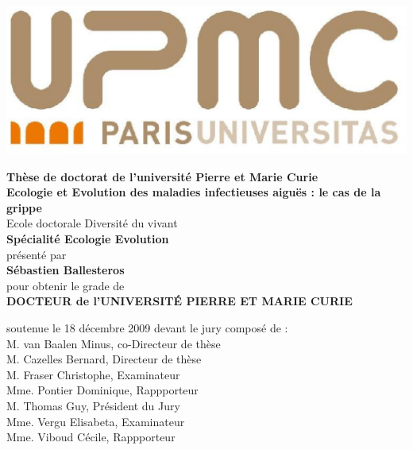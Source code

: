 \begin{titlepage}
\thispagestyle{empty}
\noindent

\includegraphics[width=0.2\linewidth]{upmc.eps}

\begin{center}
\begin{minipage}{\plarg}
\centering
{\large\bfseries Thèse de doctorat de l'université Pierre et Marie Curie}\\ \vspace{0.4cm}
{\huge\bfseries Ecologie et Evolution des maladies infectieuses aiguës : le cas
  de la grippe }\\ \vspace{0.4cm}
Ecole doctorale Diversité du vivant\\ \vspace{1mm}
{\large\bfseries Spécialité Ecologie Evolution}\\ \vspace{0.4cm}
présenté par \\ \vspace{1mm}
{\large\bfseries Sébastien Ballesteros }\\ \vspace{0.4cm}
pour obtenir le grade de \\ \vspace{1mm}
{\large\bfseries DOCTEUR de l’UNIVERSITÉ PIERRE ET MARIE CURIE}\\ \vspace{0.4cm}
\end{minipage}
\end{center}

\noindent
soutenue le 18 décembre 2009 devant le jury composé de : \vspace{5mm}\\
M. van Baalen Minus, co-Directeur de thèse\\
M. Cazelles Bernard, Directeur de thèse\\
M. Fraser Christophe, Examinateur\\
Mme. Pontier Dominique, Rappporteur\\
M. Thomas Guy, Président du Jury\\
Mme. Vergu Elisabeta, Examinateur\\
Mme. Viboud Cécile, Rappporteur\\


\vspace{0.4cm}


\end{titlepage}
